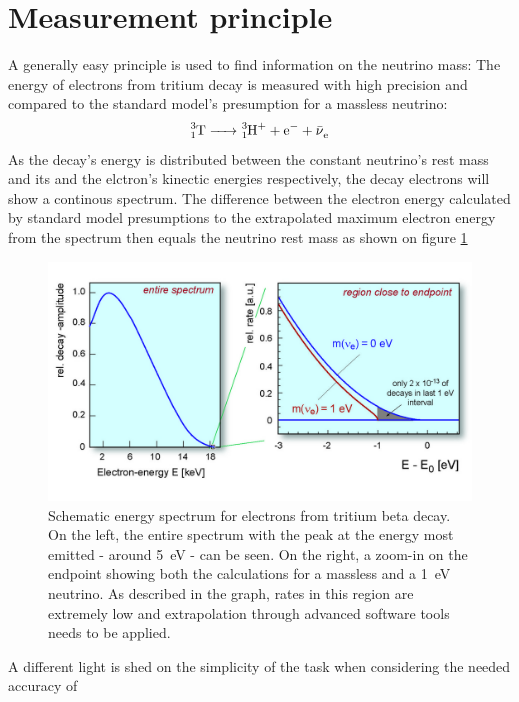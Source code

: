       \section{Measurement principle}
      \label{ch:The KATRIN experiment:sec:Measurement Principle}
      A generally easy principle is used to find information on the neutrino mass: The energy of electrons from tritium decay is measured with high precision and compared to the standard model's presumption for a massless neutrino: 
      \begin{equation}
      	\ce{^3_1T -> ^3_1H^+ + e^- + \bar{\nu}_e}
      \end{equation}
      As the decay's energy is distributed between the constant neutrino's rest mass and its and the elctron's kinectic energies respectively, the decay electrons will show a continous spectrum. The difference between the electron energy calculated by standard model presumptions to the extrapolated maximum electron energy from the spectrum then equals the neutrino rest mass as shown on figure \ref{fig:katrinExperiment:tritiumSpectrum}
      \begin{figure}
	\centering
      	\includegraphics[width = 0.9 \textwidth]{graphics/katrinExperiment/electronSpectrum.jpg}
      	\caption[Schematic tritium energy spectrum]{Schematic energy spectrum for electrons from tritium beta decay. On the left, the entire spectrum with the peak at the energy most emitted - around \SI{5}{\electronvolt} - can be seen. On the right, a zoom-in on the endpoint showing both the calculations for a massless and a \SI{1}{\electronvolt} neutrino. As described in the graph, rates in this region are extremely low and extrapolation through advanced software tools needs to be applied.}
      	\label{fig:katrinExperiment:tritiumSpectrum}
      \end{figure}
      A different light is shed on the simplicity of the task when considering the needed accuracy of 

